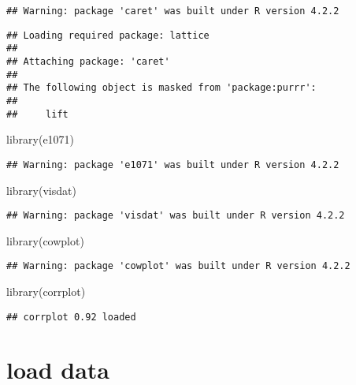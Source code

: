 \documentclass[
]{article}
\newenvironment{Shaded}{\begin{snugshade}}{\end{snugshade}}
\newcommand{\FunctionTok}[1]{\textcolor[rgb]{0.00,0.00,0.00}{#1}}
\newcommand{\NormalTok}[1]{#1}
\begin{document}
\begin{verbatim}
## Warning: package 'caret' was built under R version 4.2.2
\end{verbatim}

\begin{verbatim}
## Loading required package: lattice
## 
## Attaching package: 'caret'
## 
## The following object is masked from 'package:purrr':
## 
##     lift
\end{verbatim}

\begin{Shaded}
\begin{Highlighting}[]
\FunctionTok{library}\NormalTok{(e1071)}
\end{Highlighting}
\end{Shaded}

\begin{verbatim}
## Warning: package 'e1071' was built under R version 4.2.2
\end{verbatim}

\begin{Shaded}
\begin{Highlighting}[]
\FunctionTok{library}\NormalTok{(visdat)}
\end{Highlighting}
\end{Shaded}

\begin{verbatim}
## Warning: package 'visdat' was built under R version 4.2.2
\end{verbatim}

\begin{Shaded}
\begin{Highlighting}[]
\FunctionTok{library}\NormalTok{(cowplot)}
\end{Highlighting}
\end{Shaded}

\begin{verbatim}
## Warning: package 'cowplot' was built under R version 4.2.2
\end{verbatim}

\begin{Shaded}
\begin{Highlighting}[]
\FunctionTok{library}\NormalTok{(corrplot)}
\end{Highlighting}
\end{Shaded}

\begin{verbatim}
## corrplot 0.92 loaded
\end{verbatim}

\hypertarget{load-data}{%
\section{load data}\label{load-data}}
\end{document}

